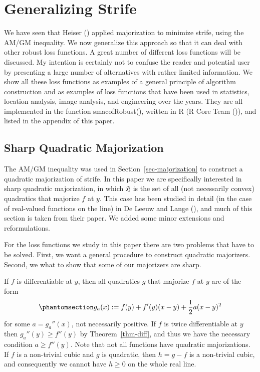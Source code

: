 \documentclass[
  12pt,
  letterpaper,
  DIV=11,
  numbers=noendperiod]{scrartcl}
\theoremstyle{plain}
\theoremstyle{plain}
\theoremstyle{plain}
\theoremstyle{definition}
\theoremstyle{definition}
\theoremstyle{remark}
\begin{document}
\section{Generalizing Strife}\label{generalizing-strife}

We have seen that Heiser () applied
majorization to minimize strife, using the AM/GM inequality. We now
generalize this approach so that it can deal with other robust loss
functions. A great number of different loss functions will be discussed.
My intention is certainly not to confuse the reader and potential user
by presenting a large number of alternatives with rather limited
information. We show all these loss functions as examples of a general
principle of algorithm construction and as examples of loss functions
that have been used in statistics, location analysis, image analysis,
and engineering over the years. They are all implemented in the function
smacofRobust(), written in R (R Core Team
()), and listed in the appendix of
this paper.

\subsection{Sharp Quadratic
Majorization}\label{sharp-quadratic-majorization}

The AM/GM inequality was used in Section~\ref{sec-majorization} to
construct a quadratic majorization of strife. In this paper we are
specifically interested in sharp quadratic majorization, in which
\(\mathfrak{H}\) is the set of all (not necessarily convex) quadratics
that majorize \(f\) at \(y\). This case has been studied in detail (in
the case of real-valued functions on the line) in De Leeuw and Lange
(), and much of this section is
taken from their paper. We added some minor extensions and
reformulations.

For the loss functions we study in this paper there are two problems
that have to be solved. First, we want a general procedure to construct
quadratic majorizers. Second, we what to show that some of our
majorizers are sharp.

If \(f\) is differentiable at \(y\), then all quadratics \(g\) that
majorize \(f\) at \(y\) are of the form
\begin{equation}\phantomsection\label{eq-qmaj}{
g_a(x):=f(y)+f'(y)(x-y)+\frac12a(x-y)^2
}\end{equation} for some \(a=g_a''(x)\), not necessarily positive. If
\(f\) is twice differentiable at \(y\) then \(g_a''(y)\geq f''(y)\) by
Theorem~\ref{thm-diff}, and thus we have the necessary condition
\(a\geq f''(y)\). Note that not all functions have quadratic
majorizations. If \(f\) is a non-trivial cubic and \(g\) is quadratic,
then \(h=g-f\) is a non-trivial cubic, and consequently we cannot have
\(h\geq 0\) on the whole real line.
\end{document}
